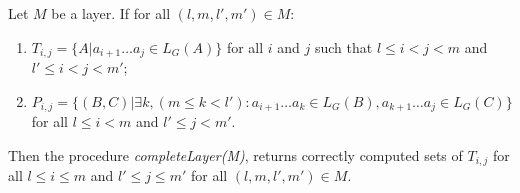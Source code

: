 \begin{theorem}
Let $M$ be a layer. If for all $(l, m, l', m') \in M$:
\begin{enumerate}
  \item $T_{i, j} = \{ A |  a_{i + 1} \dots a_{j} \in L_G(A)\}$ for all $i$ and $j$ such that $l \leq i < j < m$ and $l' \leq i < j < m'$;
  \item $P_{i, j} =  \{ (B, C) |\exists k, (m \le k < l'): a_{i + 1} \dots a_{k} \in L_G(B), a_{k + 1} \dots a_{j} \in L_G(C)\}$ for all $l \leq i < m$ and $l' \leq j < m'$.
\end{enumerate}

Then the procedure \textit{completeLayer(M)}, returns correctly computed sets of $T_{i, j}$ for all $l \leq i \le m$ and $l' \leq j \le m'$ for all $(l, m, l', m') \in M$.
\end{theorem}


